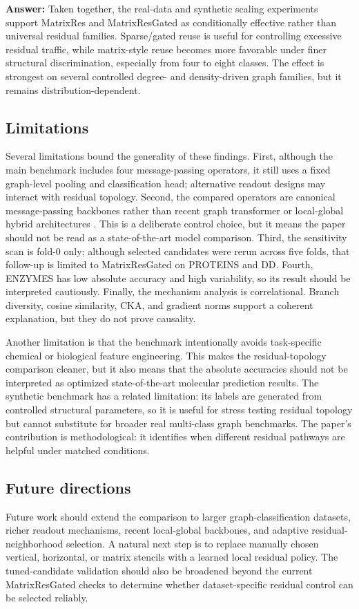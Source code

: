 \textbf{Answer:} Taken together, the real-data and synthetic scaling experiments support MatrixRes and MatrixResGated as conditionally effective rather than universal residual families. Sparse/gated reuse is useful for controlling excessive residual traffic, while matrix-style reuse becomes more favorable under finer structural discrimination, especially from four to eight classes. The effect is strongest on several controlled degree- and density-driven graph families, but it remains distribution-dependent.

\subsection{Limitations}

Several limitations bound the generality of these findings. First, although the main benchmark includes four message-passing operators, it still uses a fixed graph-level pooling and classification head; alternative readout designs may interact with residual topology. Second, the compared operators are canonical message-passing backbones rather than recent graph transformer or local-global hybrid architectures \cite{dwivedi2020generalization}. This is a deliberate control choice, but it means the paper should not be read as a state-of-the-art model comparison. Third, the sensitivity scan is fold-0 only; although selected candidates were rerun across five folds, that follow-up is limited to MatrixResGated on PROTEINS and DD. Fourth, ENZYMES has low absolute accuracy and high variability, so its result should be interpreted cautiously. Finally, the mechanism analysis is correlational. Branch diversity, cosine similarity, CKA, and gradient norms support a coherent explanation, but they do not prove causality.

Another limitation is that the benchmark intentionally avoids task-specific chemical or biological feature engineering. This makes the residual-topology comparison cleaner, but it also means that the absolute accuracies should not be interpreted as optimized state-of-the-art molecular prediction results. The synthetic benchmark has a related limitation: its labels are generated from controlled structural parameters, so it is useful for stress testing residual topology but cannot substitute for broader real multi-class graph benchmarks. The paper's contribution is methodological: it identifies when different residual pathways are helpful under matched conditions.

\subsection{Future directions}

Future work should extend the comparison to larger graph-classification datasets, richer readout mechanisms, recent local-global backbones, and adaptive residual-neighborhood selection. A natural next step is to replace manually chosen vertical, horizontal, or matrix stencils with a learned local residual policy. The tuned-candidate validation should also be broadened beyond the current MatrixResGated checks to determine whether dataset-specific residual control can be selected reliably.
